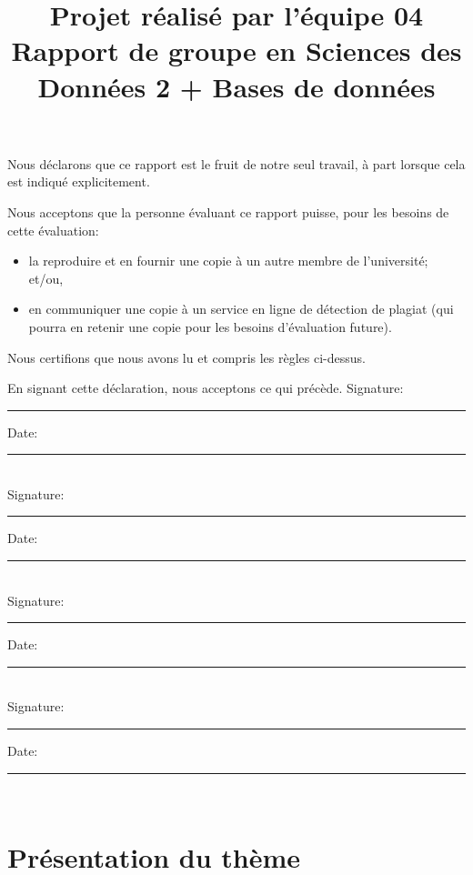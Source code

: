\documentclass[mstat,12pt]{unswthesis}
\title{Projet réalisé par l'équipe 04\\[0.5cm]Rapport de groupe en
Sciences des Données 2 + Bases de données}
\author{\Authornameonly}
\begin{document}
\beforepreface




\vskip 2pc \noindent Nous déclarons que ce rapport est le fruit de notre seul travail, à part lorsque cela est indiqué  explicitement. 

\vskip 2pc  \noindent Nous acceptons que la personne évaluant ce rapport puisse, pour les besoins de cette évaluation:
\begin{itemize}
\item la reproduire et en fournir une copie à un autre membre de l'université; et/ou,
\item en communiquer une copie à un service en ligne de détection de plagiat (qui pourra en retenir une copie pour les besoins d'évaluation future).
\end{itemize}

\vskip 2pc \noindent Nous certifions que nous avons lu et compris les règles ci-dessus.\vspace{24pt}

\vskip 2pc \noindent En signant cette déclaration, nous acceptons ce qui précède.
\vskip 2pc \noindent
Signature: \rule{7cm}{0.25pt} \hfill Date: \rule{4cm}{0.25pt} \\[1cm]
Signature: \rule{7cm}{0.25pt} \hfill Date: \rule{4cm}{0.25pt} \\[1cm]
Signature: \rule{7cm}{0.25pt} \hfill Date: \rule{4cm}{0.25pt} \\[1cm]
Signature: \rule{7cm}{0.25pt} \hfill Date: \rule{4cm}{0.25pt} \\[1cm]
\vskip 1pc





\afterpreface





%
%






\hypertarget{pruxe9sentation-du-thuxe8me}{%
\chapter{Présentation du thème}\label{pruxe9sentation-du-thuxe8me}}
\end{document}
